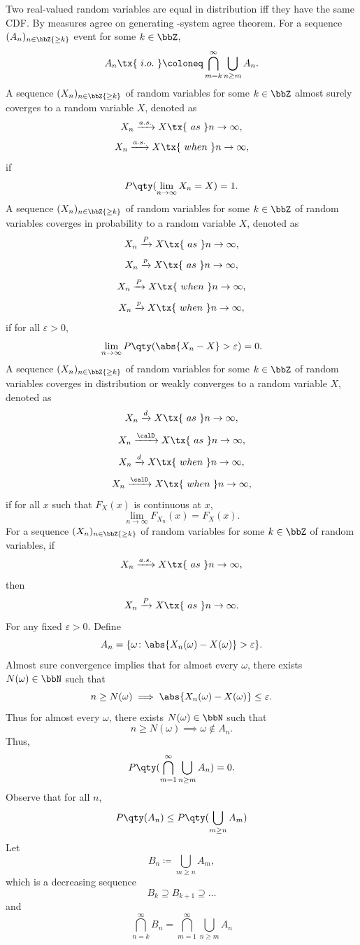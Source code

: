 \documentclass[a4paper,12pt]{report}
\begin{document}
Two real-valued random variables are equal in distribution iff they have the same CDF.
\bpr
By measures agree on generating \textpi-system agree theorem.
\epr
{}
For a sequence $(A_n)_{n\in\bbZ{\ge k}}$ event for some $k\in\bbZ$,
\[A_n\tx{\ i.o.\ }\coloneq\bigcap_{m=k}^{\infty}\bigcup_{n\ge m}A_n.\]
A sequence $(X_n)_{n\in\bbZ{\ge k}}$ of random variables for some $k\in\bbZ$ almost surely coverges to a random variable $X$, denoted as
\[X_n\xrightarrow{a.s.}X\tx{\ as\ }n\to\infty,\]
\[X_n\xrightarrow{a.s.}X\tx{\ when\ }n\to\infty,\]
if
\[P\qty(\lim_{n\to\infty}X_n=X)=1.\]
A sequence $(X_n)_{n\in\bbZ{\ge k}}$ of random variables for some $k\in\bbZ$ of random variables coverges in probability to a random variable $X$, denoted as
\[X_n\xrightarrow{P}X\tx{\ as\ }n\to\infty,\]
\[X_n\xrightarrow{p}X\tx{\ as\ }n\to\infty,\]
\[X_n\xrightarrow{P}X\tx{\ when\ }n\to\infty,\]
\[X_n\xrightarrow{p}X\tx{\ when\ }n\to\infty,\]
if for all $\varepsilon>0$,
\[\lim_{n\to\infty}P\qty(\abs{X_n-X}>\varepsilon)=0.\]
A sequence $(X_n)_{n\in\bbZ{\ge k}}$ of random variables for some $k\in\bbZ$ of random variables coverges in distribution or weakly converges to a random variable $X$, denoted as
\[X_n\xrightarrow{d}X\tx{\ as\ }n\to\infty,\]
\[X_n\xrightarrow{\calD}X\tx{\ as\ }n\to\infty,\]
\[X_n\xrightarrow{d}X\tx{\ when\ }n\to\infty,\]
\[X_n\xrightarrow{\calD}X\tx{\ when\ }n\to\infty,\]
if for all $x$ such that $F_X(x)$ is continuous at $x$,
\[\lim_{n\to\infty}F_{X_n}(x)=F_X(x).\]
For a sequence $(X_n)_{n\in\bbZ{\ge k}}$ of random variables for some $k\in\bbZ$ of random variables, if
\[X_n\xrightarrow{a.s.}X\tx{\ as\ }n\to\infty,\]
then
\[X_n\xrightarrow{P}X\tx{\ as\ }n\to\infty.\]
\bpr
For any fixed $\varepsilon>0$. Define
\[A_n=\{\omega\colon\abs{X_n(\omega)-X(\omega)}>\varepsilon\}.\]
Almost sure convergence implies that for almost every $\omega$, there exists $N(\omega)\in\bbN$ such that
\[n\ge N(\omega)\implies\abs{X_n(\omega)-X(\omega)}\le\varepsilon.\]
Thus for almost every $\omega$, there exists $N(\omega)\in\bbN$ such that
\[n\ge N(\omega)\implies\omega\notin A_n.\]
Thus,
\[P\qty(\bigcap_{m=1}^{\infty}\bigcup_{n\ge m}A_n)=0.\]
Observe that for all $n$,
\[P\qty(A_n)\le P\qty(\bigcup_{m\ge n}A_m)\]
Let
\[B_n\coloneq\bigcup_{m\ge n}A_m,\]
which is a decreasing sequence
\[B_k\supseteq B_{k+1}\supseteq\ldots\]
and
\[\bigcap_{n=k}^{\infty}B_n=\bigcap_{m=1}^{\infty}\bigcup_{n\ge m}A_n\]
\end{document}
